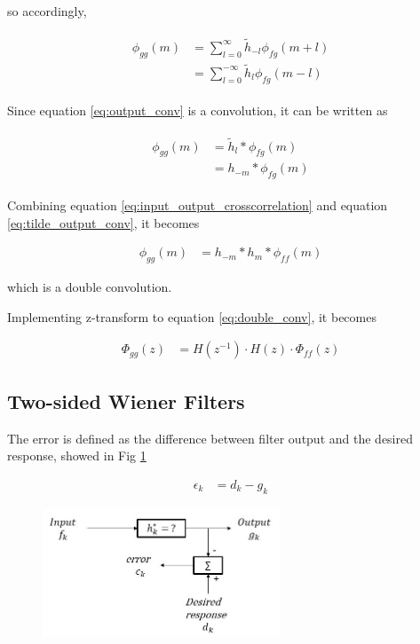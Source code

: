 \documentclass[8pt,a4paper]{article}
\begin{document}
\begin{multicols}{2}
so accordingly, 

\begin{align}
  \label{eq:output_conv}
  \begin{split}
    \phi_{gg}(m) &= \sum_{l=0}^{\infty} \tilde{h}_{-l} \phi_{fg}(m+l) \\
    &= \sum_{l=0}^{-\infty} \tilde{h}_{l} \phi_{fg}(m-l)
  \end{split}
\end{align}

Since equation \ref{eq:output_conv} is a convolution, it can be written as

\begin{align}
  \label{eq:tilde_output_conv}
  \begin{split}
    \phi_{gg}(m) &= \tilde{h}_{l} * \phi_{fg}(m) \\
    &= h_{-m} * \phi_{fg}(m)
  \end{split}
\end{align}


Combining equation \ref{eq:input_output_crosscorrelation} and equation \ref{eq:tilde_output_conv}, it becomes 

\begin{align}
  \label{eq:double_conv}
  \phi_{gg}(m) &= h_{-m} * h_{m} * \phi_{ff}(m)
\end{align}

which is a double convolution.

Implementing z-transform to equation \ref{eq:double_conv}, it becomes

\begin{align}
  \Phi_{gg}(z) &= H(z^{-1}) \cdot H(z) \cdot \Phi_{ff}(z)
\end{align}


\subsection*{Two-sided Wiener Filters}

The error is defined as the difference between filter output and the desired response, showed in Fig \ref{fig:wiener}

\begin{align}
  \label{eq:error}
  \epsilon_{k} &= d_{k} - g_{k}
\end{align}


\begin{figure}[H]
  \begin{center}
      \includegraphics[width=200pt]{./Figures/wiener.jpg}
      \caption{}
      \label{fig:wiener}
  \end{center}
\end{figure}



\end{multicols}
\end{document}
